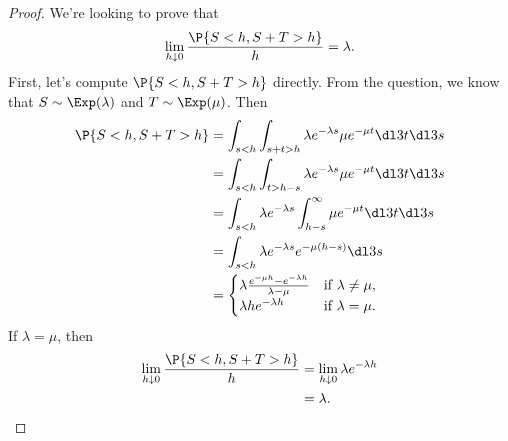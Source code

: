 \documentclass[
  coursecode={MTHE 455},
  assignmentname={Assignment \assignmentnumber},
  studentnumber=20053722,
  name={Bryan Hoang},
  draft,
]{
  ltxanswer%
}
\begin{document}
  \begin{questions}
    \setcounter{question}{\questionnumber}
    \addtocounter{question}{-1}
    \question[5]\
    \begin{parts}
      \part{}
      \begin{solution}
        \begin{proof}
          We're looking to prove that
          \begin{equation*}
            \lim_{h \downarrow 0} \frac{\P{S < h, S + T > h}}{h} = \lambda.
          \end{equation*}
          First, let's compute \(\P{S < h, S + T > h}\) directly. From the question, we know that \(S \sim \Exp(\lambda)\) and \(T \sim \Exp(\mu)\). Then
          \begin{align*}
            \P{S < h, S + T > h} &= \int_{s < h} \int_{s + t > h} \lambda e^{-\lambda s} \mu e^{-\mu t} \dl3t \dl3s                                          \\
                                 &= \int_{s < h} \int_{t > h - s} \lambda e^{-\lambda s} \mu e^{-\mu t} \dl3t \dl3s                                          \\
                                 &= \int_{s < h} \lambda e^{-\lambda s} \int_{h - s}^{\infty} \mu e^{-\mu t} \dl3t \dl3s                                     \\
                                 &= \int_{s < h} \lambda e^{-\lambda s} e^{-\mu(h - s)} \dl3s                                                                \\
                                 &= \begin{cases}
                                      \lambda \frac{e^{-\mu h} - e^{-\lambda h}}{\lambda - \mu} &\text{if}\ \lambda \ne \mu, \\
                                      \lambda h e^{-\lambda h}                                  &\text{if}\ \lambda = \mu.
                                    \end{cases}
          \end{align*}
          If \(\lambda = \mu\), then
          \begin{align*}
            \lim_{h \downarrow 0} \frac{\P{S < h, S + T > h}}{h} &= \lim_{h \downarrow 0} \lambda e^{-\lambda h} \\
                                                                 &= \lambda.

\end{align*}
\end{proof}
\end{solution}
\end{parts}
\end{questions}
\end{document}
